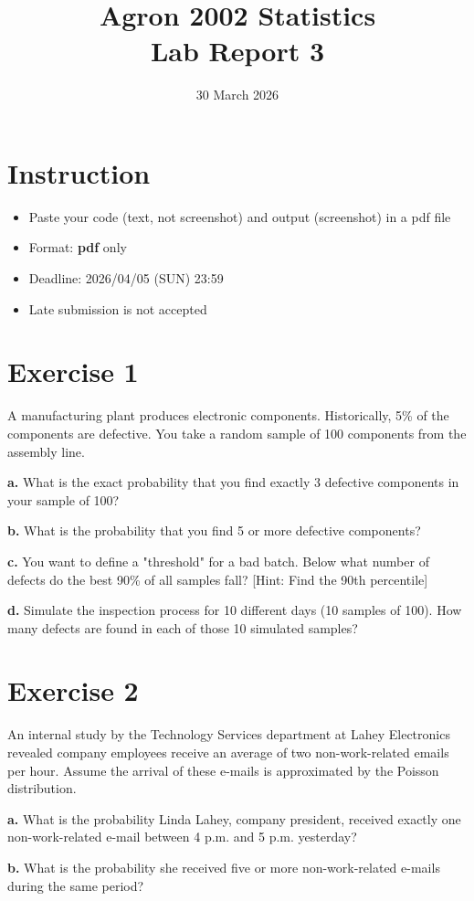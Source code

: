 \documentclass[12pt,letterpaper]{article}
\title{Agron 2002 Statistics\\ {\bf Lab Report 3}}
\date{30 March 2026}
\begin{document}
\maketitle
\section*{Instruction}
\begin{itemize}
    \item Paste your code (text, not screenshot) and output (screenshot) in a pdf file
    \item Format: \textbf{pdf} only
    \item Deadline: 2026/04/05 (SUN) 23:59
    \item Late submission is not accepted
\end{itemize}


\section*{Exercise 1}
A manufacturing plant produces electronic components. Historically, 5\% of the components are defective. You take a random sample of 100 components from the assembly line.

\textbf{a.} What is the exact probability that you find exactly 3 defective components in your sample of 100?

\textbf{b.} What is the probability that you find 5 or more defective components?

\textbf{c.} You want to define a "threshold" for a bad batch. Below what number of defects do the best 90\% of all samples fall? [Hint: Find the 90th percentile]

\textbf{d.} Simulate the inspection process for 10 different days (10 samples of 100). How many defects are found in each of those 10 simulated samples?

\section*{Exercise 2}
An internal study by the Technology Services department at Lahey Electronics revealed
company employees receive an average of two non-work-related emails per hour. Assume the arrival of these e-mails is approximated by the Poisson distribution.

\textbf{a.} What is the probability Linda Lahey, company president, received exactly one non-work-related e-mail between 4 p.m. and 5 p.m. yesterday?

\textbf{b.} What is the probability she received five or more non-work-related e-mails during the same period?
\end{document}
